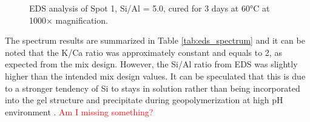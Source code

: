 \begin{figure}[H]
    \centering
    \hfill
    \caption{EDS analysis of Spot 1, Si/Al = 5.0, cured for 3 days at 60°C at 1000× magnification.}
    \label{fig:eds_spot1_5-0}
\end{figure}

The spectrum results are summarized in Table \ref{tab:eds_spectrum} and it can be noted that the K/Ca ratio was approximately constant and equals to 2, as expected from the mix design.
However, the Si/Al ratio from EDS was slightly higher than the intended mix design values.
It can be speculated that this is due to a stronger tendency of Si to stays in solution rather than being incorporated into the gel structure and precipitate during geopolymerization at high pH environment \cite{chen2024synthesis}.
\textcolor{red}{Am I missing something?}

